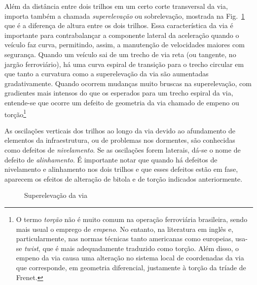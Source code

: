 Além da distância entre dois trilhos em um certo corte transversal da via, importa também a chamada \textit{superelevação} ou sobrelevação, mostrada na Fig.~\ref{fig: superelevacao}  que é a diferença de altura entre os dois trilhos. Essa característica da via é importante para contrabalançar a componente lateral da aceleração quando o veículo faz curva, permitindo, assim, a manutenção de velocidades maiores com segurança. Quando um veículo sai de um trecho de via reta (ou tangente, no jargão ferroviário), há uma curva espiral de transição para o trecho circular em que tanto a curvatura como a superelevação da via são aumentadas gradativamente. Quando ocorrem mudanças muito bruscas na superelevação, com gradientes mais intensos do que os esperados para um trecho espiral da via, entende-se que ocorre um defeito de geometria da via chamado de empeno ou torção\footnote{O termo \textit{torção} não é muito comum na operação ferroviária brasileira, sendo mais usual o emprego de \textit{empeno}. No entanto, na literatura em inglês e, particularmente, nas normas técnicas tanto americanas como europeias, usa-se \textit{twist}, que é mais adequadamente traduzido como torção. Além disso, o empeno da via causa uma alteração no sistema local de coordenadas da via que corresponde, em geometria diferencial, justamente à torção da tríade de Frenet.}

As oscilações verticais dos trilhos ao longo da via devido ao afundamento de elementos da infraestrutura, ou de problemas nos dormentes, são conhecidas como defeitos de \textit{nivelamento}. Se as oscilações forem laterais, dá-se o nome de defeito de \textit{alinhamento}. É importante notar que quando há defeitos de nivelamento e alinhamento nos dois trilhos e que esses defeitos estão em fase, aparecem os efeitos de alteração de bitola e de torção indicados anteriormente.

\begin{figure}
    \centering
    \caption{Superelevação da via}\label{fig: superelevacao}
\end{figure}

